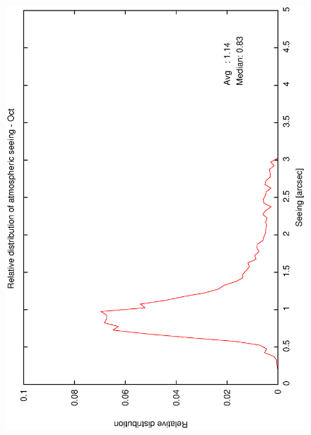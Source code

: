 {{\begin{figure}[htbp]
\begin{center}
{   \includegraphics[scale=0.25, angle=-90]{figures/ecs/corr_see_dist_oct.eps}  
   \label{fig:see_dist_oct}
  }
 \subfigure[] {
}
\end{center}
\end{figure}}}
